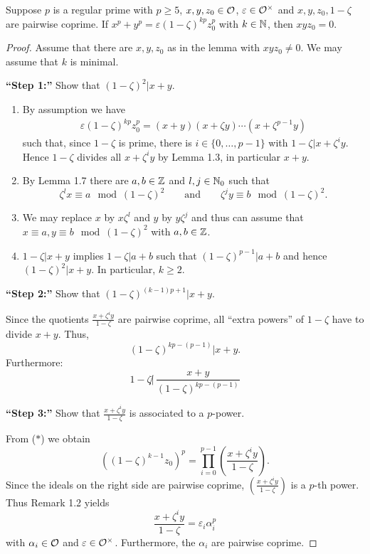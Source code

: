 \begin{Lem}
	Suppose $p$ is a regular prime with $p \geq 5$, $x,y,z_0 \in\mathcal{O}$, $\varepsilon \in \mathcal{O}^\times$ and $x,y,z_0, 1-\zeta $ are pairwise coprime.
	If $x^p + y^p = \varepsilon (1-\zeta)^{kp} z_0^p$
	with $k \in \mathbb{N}$, then $xyz_0 = 0$.
\end{Lem}


\begin{proof}
	Assume that there are $x,y,z_0$ as in the lemma with $xyz_0 \neq 0$.
	We may assume that $k$ is minimal.
	
	\bigskip \textbf{\enquote{Step 1:}}
	Show that $(1-\zeta)^2 | x+y$.
	
	\begin{enumerate}[(1)]
		\item By assumption we have
		\begin{align}
		\varepsilon (1-\zeta)^{kp} z_0^p
		= (x+y)(x+\zeta y) \cdots \left( x+\zeta^{p-1} y \right) \tag{$*$}
		\end{align}
		such that, since $1-\zeta$ is prime, there is $i \in \{ 0, \dots, p-1 \}$ with
		$1-\zeta | x+ \zeta^i y$.
		Hence $1-\zeta$ divides all $x+ \zeta^i y$ by Lemma 1.3, in particular $x+y$.
		\item By Lemma 1.7 there are $a,b \in \mathbb{Z}$ and $l,j \in\mathbb{N}_0$ such that
		\[ \zeta^l x \equiv a \mod (1-\zeta) ^2
		\qquad \text{and} \qquad
		\zeta^j y \equiv b \mod (1-\zeta) ^2.
		\]
		\item We may replace $x$ by $x\zeta^l$ and $y$ by $y\zeta^j$ and thus can assume that $x\equiv a, y \equiv b \mod (1-\zeta) ^2$ with $a,b\in \mathbb{Z}$.
		\item $1-\zeta | x+y$ implies $1-\zeta | a+b$ such that $(1-\zeta) ^{p-1} | a+b$ and hence $(1-\zeta)^2 | x+y$. In particular, $k \geq 2$.
	\end{enumerate}
	
	\bigskip \textbf{\enquote{Step 2:}}
	Show that $(1-\zeta)^{(k-1)p+1} | x+y$.
	
	Since the quotients $\frac{x+\zeta^i y}{1-\zeta}$ are pairwise coprime, all \enquote{extra powers} of $1-\zeta$ have to divide $x+y$. Thus,
	\[(1-\zeta)^{kp-(p-1)} | x+y.
	\]
	Furthermore: 
	\[ 1- \zeta \not | \, \frac{x+y}{(1-\zeta)^{kp-(p-1)}}
	\]
	
	\bigskip \textbf{\enquote{Step 3:}}
	Show that $\frac{x+\zeta^i y}{1-\zeta}$ is associated to a $p$-power.
	
	From ($*$) we obtain
	\[ \left( (1-\zeta)^{k-1} z_0 \right)^p
	= \prod_{i=0}^{p-1} \left( \frac{x+\zeta^i y}{1-\zeta} \right).
	\]
	Since the ideals on the right side are pairwise coprime, $ \left( \frac{x+\zeta^i y}{1-\zeta} \right)$ is a $p$-th power. Thus Remark 1.2 yields
	\[ \frac{x+\zeta^i y}{1-\zeta} = \varepsilon_i \alpha_i^p
	\]
	with $\alpha_i \in \mathcal{O}$ and $\varepsilon \in\mathcal{O}^\times$. Furthermore, the $\alpha_i$ are pairwise coprime.
	

\end{proof}
